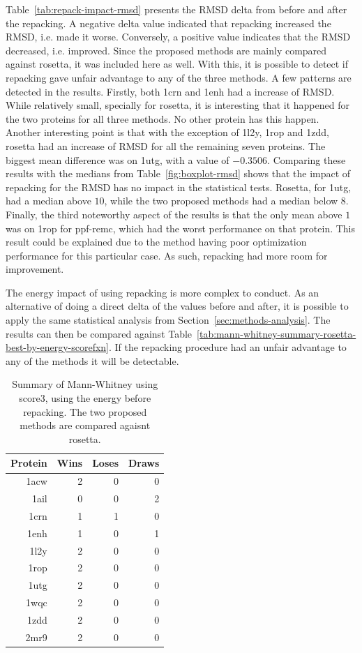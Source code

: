 Table~\ref{tab:repack-impact-rmsd} presents the RMSD delta from before and after
the repacking. A negative delta value indicated that repacking increased the RMSD,
i.e. made it worse. Conversely, a positive value indicates that the RMSD decreased,
i.e. improved.
Since the proposed methods are mainly compared against rosetta,
it was included here as well. With this, it is possible to detect if repacking
gave unfair advantage to any of the three methods. A few patterns are detected
in the results. Firstly, both 1crn and 1enh had a increase of RMSD. While
relatively small, specially for rosetta, it is interesting that it happened for
the two proteins for all three methods. No other protein has this happen.
Another interesting point is that with the exception of 1l2y, 1rop and 1zdd,
rosetta had an increase of RMSD for all the remaining seven proteins. The
biggest mean difference was on 1utg, with a value of $-0.3506$. Comparing these
results with the medians from Table~\ref{fig:boxplot-rmsd} shows that the
impact of repacking for the RMSD has no impact in the statistical tests. Rosetta,
for 1utg, had a median above $10$, while the two proposed methods had a median
below $8$. Finally, the third noteworthy aspect of the results is that the only
mean above $1$ was on 1rop for ppf-remc, which had the worst performance
on that protein. This result could be explained due to the method having poor
optimization performance for this particular case. As such, repacking had more
room for improvement.

The energy impact of using repacking is more complex to conduct. As an
alternative of doing a direct delta of the values before and after, it is
possible to apply the same statistical analysis from
Section~\ref{sec:methods-analysis}. The results can then be compared
against Table~\ref{tab:mann-whitney-summary-rosetta-best-by-energy-scorefxn}.
If the repacking procedure had an unfair advantage to any of the methods
it will be detectable.

\begin{table}
  \centering
  \begin{tabular}{r|r|r|r}
  Protein & Wins & Loses & Draws \\ \hline \hline
   1acw &  2 &  0 &  0 \\ \hline
   1ail &  0 &  0 &  2 \\ \hline
   1crn &  1 &  1 &  0 \\ \hline
   1enh &  1 &  0 &  1 \\ \hline
   1l2y &  2 &  0 &  0 \\ \hline
   1rop &  2 &  0 &  0 \\ \hline
   1utg &  2 &  0 &  0 \\ \hline
   1wqc &  2 &  0 &  0 \\ \hline
   1zdd &  2 &  0 &  0 \\ \hline
   2mr9 &  2 &  0 &  0 \\ \hline
  \end{tabular}
  \caption{Summary of Mann-Whitney using score3, using the energy before repacking.
  The two proposed methods are compared agaisnt rosetta.}
  \label{tab:mann-whitney-summary-best-by-energy-score3}
\end{table}

